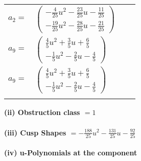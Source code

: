 \documentclass[1p]{elsarticle_modified}
\theoremstyle{definition}
\begin{document}
\begin{tabular}{m{7pt} m{180pt} m{7pt} m{180pt} }
\flushright $a_{2}=$&$\begin{pmatrix}-\frac{4}{25} u^2-\frac{23}{25} u-\frac{11}{25}\\-\frac{19}{25} u^2-\frac{28}{25} u-\frac{21}{25}\end{pmatrix}$ \\
\flushright $a_{9}=$&$\begin{pmatrix}\frac{4}{5} u^2+\frac{3}{5} u+\frac{6}{5}\\-\frac{1}{5} u^2-\frac{2}{5} u-\frac{4}{5}\end{pmatrix}$\\ \flushright $a_{9}=$&$\begin{pmatrix}\frac{4}{5} u^2+\frac{3}{5} u+\frac{6}{5}\\-\frac{1}{5} u^2-\frac{2}{5} u-\frac{4}{5}\end{pmatrix}$\\&\end{tabular}
\flushleft \textbf{(ii) Obstruction class $= 1$}\\~\\
\flushleft \textbf{(iii) Cusp Shapes $= -\frac{188}{25} u^2-\frac{131}{25} u-\frac{92}{25}$}\\~\\
\newpage\renewcommand{\arraystretch}{1}
\flushleft \textbf{(iv) u-Polynomials at the component}\newline \\
\end{document}
